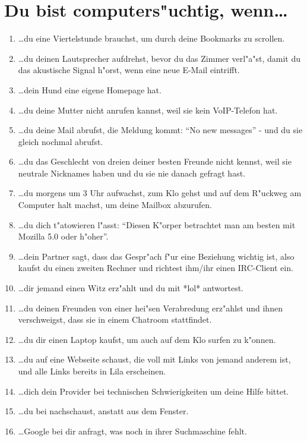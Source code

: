 \section*{\Large{Du bist computers"uchtig, wenn\ldots}}

\begin{enumerate}
\item \ldots du eine Viertelstunde brauchst, um durch deine Bookmarks zu scrollen.
\item \ldots du deinen Lautsprecher aufdrehst, bevor du das Zimmer verl"a"st, damit du das akustische Signal h"orst, wenn eine neue E-Mail eintrifft.
\item \ldots dein Hund eine eigene Homepage hat.
\item \ldots du deine Mutter nicht anrufen kannst, weil sie kein VoIP-Telefon hat.
\item \ldots du deine Mail abrufst, die Meldung kommt: "`No new messages"' - und du sie gleich nochmal abrufst.
\item \ldots du das Geschlecht von dreien deiner besten Freunde nicht kennst, weil sie neutrale Nicknames haben und du sie nie danach gefragt hast.
\item \ldots du morgens um 3 Uhr aufwachst, zum Klo gehst und auf dem R"uckweg am Computer halt machst, um deine Mailbox abzurufen.
\item \ldots du dich t"atowieren l"asst: "`Diesen K"orper betrachtet man am besten mit Mozilla 5.0 oder h"oher"'.
\item \ldots dein Partner sagt, dass das Gespr"ach f"ur eine Beziehung wichtig ist, also kaufst du einen zweiten Rechner und richtest ihm/ihr einen IRC-Client ein.
\item \ldots dir jemand einen Witz erz"ahlt und du mit *lol* antwortest.
\item \ldots du deinen Freunden von einer hei"sen Verabredung erz"ahlst und ihnen verschweigst, dass sie in einem Chatroom stattfindet.
\item \ldots du dir einen Laptop kaufst, um auch auf dem Klo surfen zu k"onnen.
\item \ldots du auf eine Webseite schaust, die voll mit Links von jemand anderem ist, und alle Links bereits in Lila erscheinen.
\item \ldots dich dein Provider bei technischen Schwierigkeiten um deine Hilfe bittet.
\item \ldots du bei  nachschaust, anstatt aus dem Fenster.
\item \ldots Google bei dir anfragt, was noch in ihrer Suchmaschine fehlt.

\end{enumerate}
